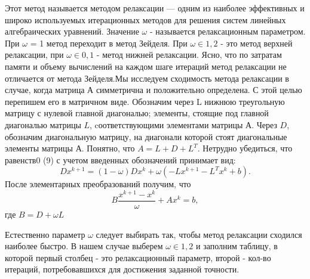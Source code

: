 \documentclass[a4paper,12pt]{article}
\begin{document}
\hspace{0.5cm} Этот метод называется методом релаксации — одним из наиболее эффективных и 
широко используемых итерационных методов для решения систем линейных алгебраических уравнений. 
Значение $\omega$ - называется релаксационным параметром. При $\omega$ = 1 метод переходит в 
метод Зейделя. При $\omega\in{1,2}$ - это метод верхней релаксации, при $\omega\in{0,1}$ - метод нижней релаксации. 
Ясно, что по затратам памяти и объему вычислений на каждом шаге итераций метод релаксации 
не отличается от метода Зейделя.Мы исследуем сходимость метода релаксации 
в случае, когда матрица А симметрична и положительно определена. С этой целью перепишем его
в матричном виде. Обозначим через L нижнюю треугольную матрицу с
нулевой главной диагональю; элементы, стоящие под главной диагональю
матрицы $L$, cоответствующими элементами матрицы $А$. Через $D$, обозначим диагональную матрицу, 
на диагонали которой стоят диагональные элементы матрицы А. Понятно, что $A = L + D + L^T$. 
Нетрудно убедиться, что равенств0 (9) с учетом введенных обозначений принимает вид:
\begin{equation*}
  Dx^{k + 1} = (1 - \omega)Dx^k + \omega(-Lx^{k + 1} - L^T x^k + b). 
\end{equation*}
\hspace{0.5cm} После элементарных преобразований получим, что
\begin{equation}
  B\frac{x^{k + 1} - x^k}{\omega} + Ax^k = b,
\end{equation}
где $B = D + \omega L$

\hspace{1cm} Естественно параметр $\omega$ следует выбирать так, чтобы метод релаксации 
сходился наиболее быстро. В нашем случае выберем $\omega \in{1, 2}$ и заполним таблицу, в которой 
первый столбец - это релаксационный параметр, второй - кол-во итераций, потребовавшихся для достижения 
заданной точности.
\newpage
\end{document}
